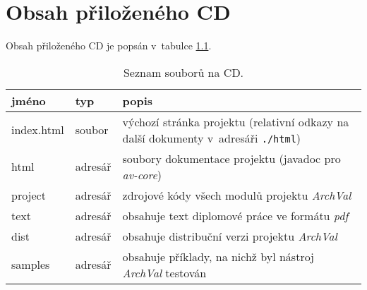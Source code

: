 \chapter{Obsah přiloženého CD}

Obsah přiloženého CD je popsán v~tabulce \ref{cd_files_table}.

\begin{table}[ht]
  \centering
  \begin{tabular}{|l|l|p{20em}|}
    \hline
    jméno & typ & popis \\
    \hline
    \hline
    index.html & soubor & výchozí stránka projektu (relativní odkazy na další dokumenty v~adresáři \verb+./html+) \\
    \hline
    html & adresář & soubory dokumentace projektu (javadoc pro \emph{av-core}) \\
    \hline
    project & adresář & zdrojové kódy všech modulů projektu \emph{ArchVal} \\
    \hline
    text & adresář & obsahuje text diplomové práce ve formátu \emph{pdf} \\
    \hline
    dist & adresář & obsahuje distribuční verzi projektu \emph{ArchVal} \\
    \hline
    samples & adresář & obsahuje příklady, na nichž byl nástroj \emph{ArchVal} testován \\
    \hline
  \end{tabular}
  \caption{Seznam souborů na CD. \label{cd_files_table}}
\end{table}
